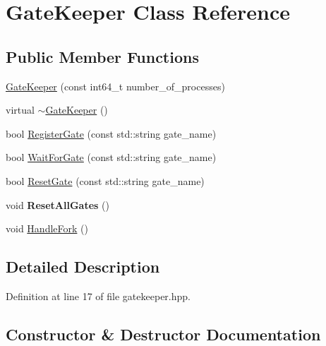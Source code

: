\hypertarget{class_gate_keeper}{}\section{Gate\+Keeper Class Reference}
\label{class_gate_keeper}
\subsection*{Public Member Functions}
\begin{DoxyCompactItemize}
\item 
\hyperlink{class_gate_keeper_ac88af67fa4ffd1bda3fdc3ff39ff86e8}{Gate\+Keeper} (const int64\+\_\+t number\+\_\+of\+\_\+processes)
\item 
virtual \hyperlink{class_gate_keeper_a9c38866d0a0dc540e49fb627e7a4fce6}{$\sim$\+Gate\+Keeper} ()
\item 
bool \hyperlink{class_gate_keeper_a3ae6feee6b303373f18bf78e05663fd0}{Register\+Gate} (const std\+::string gate\+\_\+name)
\item 
bool \hyperlink{class_gate_keeper_aed9fa041ed2db04d102918d4e3e96bc6}{Wait\+For\+Gate} (const std\+::string gate\+\_\+name)
\item 
bool \hyperlink{class_gate_keeper_a3c8a90e18b355301102e952e70dc7d2c}{Reset\+Gate} (const std\+::string gate\+\_\+name)
\item 
\hypertarget{class_gate_keeper_aa6d9b77ce0044fefbffbff511da1731b}{}\label{class_gate_keeper_aa6d9b77ce0044fefbffbff511da1731b} 
void {\bfseries Reset\+All\+Gates} ()
\item 
void \hyperlink{class_gate_keeper_aa3a114e978cecdf1f6b6320bf5895ee7}{Handle\+Fork} ()
\end{DoxyCompactItemize}


\subsection{Detailed Description}


Definition at line 17 of file gatekeeper.\+hpp.



\subsection{Constructor \& Destructor Documentation}
\hypertarget{class_gate_keeper_ac88af67fa4ffd1bda3fdc3ff39ff86e8}{}\label{class_gate_keeper_ac88af67fa4ffd1bda3fdc3ff39ff86e8} 
